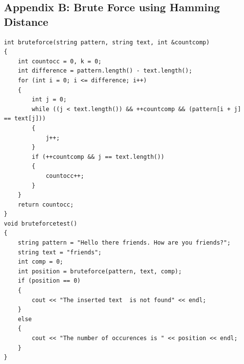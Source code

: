 \documentclass{article}
\theoremstyle{plain}
\begin{document}
\subsection*{Appendix B: Brute Force using Hamming Distance}
\begin{verbatim}
int bruteforce(string pattern, string text, int &countcomp)
{
    int countocc = 0, k = 0;
    int difference = pattern.length() - text.length();
    for (int i = 0; i <= difference; i++)
    {
        int j = 0;
        while ((j < text.length()) && ++countcomp && (pattern[i + j] == text[j]))
        {
            j++;
        }
        if (++countcomp && j == text.length())
        {
            countocc++;
        }
    }
    return countocc;
}
void bruteforcetest()
{
    string pattern = "Hello there friends. How are you friends?";
    string text = "friends";
    int comp = 0;
    int position = bruteforce(pattern, text, comp);
    if (position == 0)
    {
        cout << "The inserted text  is not found" << endl;
    }
    else
    {
        cout << "The number of occurences is " << position << endl;
    }
} 
\end{verbatim}
\newpage
\end{document}
